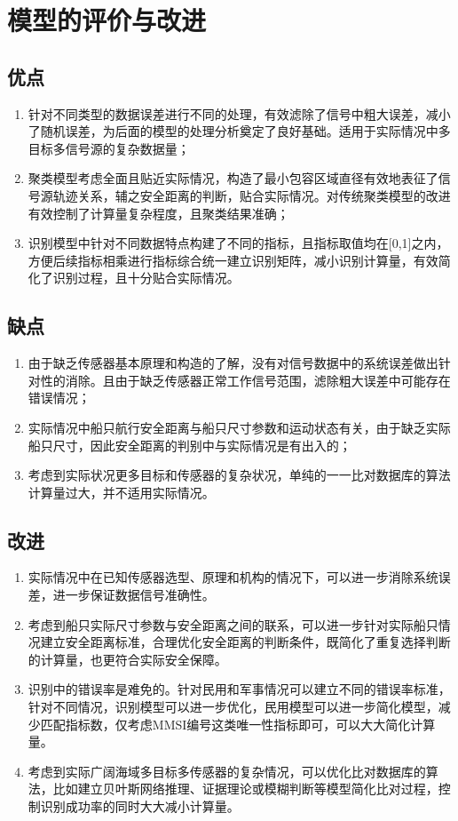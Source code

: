 \clearpage
\section{模型的评价与改进}
\subsection{优点}
\begin{enumerate}
	\item 针对不同类型的数据误差进行不同的处理，有效滤除了信号中粗大误差，减小了随机误差，为后面的模型的处理分析奠定了良好基础。适用于实际情况中多目标多信号源的复杂数据量；
	\item 聚类模型考虑全面且贴近实际情况，构造了最小包容区域直径有效地表征了信号源轨迹关系，辅之安全距离的判断，贴合实际情况。对传统聚类模型的改进有效控制了计算量复杂程度，且聚类结果准确；
	\item 识别模型中针对不同数据特点构建了不同的指标，且指标取值均在[0,1]之内，方便后续指标相乘进行指标综合统一建立识别矩阵，减小识别计算量，有效简化了识别过程，且十分贴合实际情况。
\end{enumerate}
\subsection{缺点}
\begin{enumerate}
	\item 由于缺乏传感器基本原理和构造的了解，没有对信号数据中的系统误差做出针对性的消除。且由于缺乏传感器正常工作信号范围，滤除粗大误差中可能存在错误情况；
	\item 实际情况中船只航行安全距离与船只尺寸参数和运动状态有关，由于缺乏实际船只尺寸，因此安全距离的判别中与实际情况是有出入的；
	\item 考虑到实际状况更多目标和传感器的复杂状况，单纯的一一比对数据库的算法计算量过大，并不适用实际情况。
\end{enumerate}
\subsection{改进}
\begin{enumerate}
	\item 实际情况中在已知传感器选型、原理和机构的情况下，可以进一步消除系统误差，进一步保证数据信号准确性。
	\item 考虑到船只实际尺寸参数与安全距离之间的联系，可以进一步针对实际船只情况建立安全距离标准，合理优化安全距离的判断条件，既简化了重复选择判断的计算量，也更符合实际安全保障。
	\item 识别中的错误率是难免的。针对民用和军事情况可以建立不同的错误率标准，针对不同情况，识别模型可以进一步优化，民用模型可以进一步简化模型，减少匹配指标数，仅考虑MMSI编号这类唯一性指标即可，可以大大简化计算量。
	\item 考虑到实际广阔海域多目标多传感器的复杂情况，可以优化比对数据库的算法，比如建立贝叶斯网络推理、证据理论或模糊判断等模型简化比对过程，控制识别成功率的同时大大减小计算量。
\end{enumerate}
